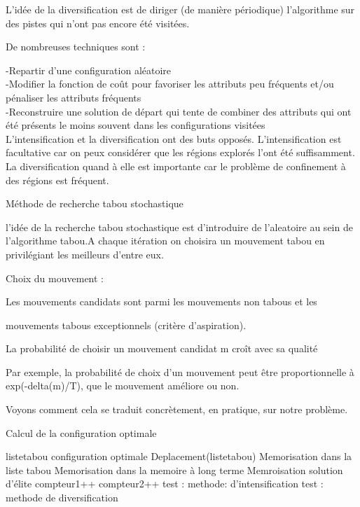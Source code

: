 \documentclass{report}
\begin{document}
L’idée de la diversification est de diriger (de manière périodique) l’algorithme sur des pistes qui n’ont pas encore été visitées.

De nombreuses techniques sont :

-Repartir d’une configuration aléatoire\\
-Modifier la fonction de coût pour favoriser les attributs peu fréquents et/ou pénaliser les attributs fréquents\\
-Reconstruire une solution de départ qui tente de combiner des attributs qui ont été présents le moins souvent dans les configurations visitées\\

L’intensification et la diversification ont des buts opposés. L’intensification est facultative
car on peux considérer que les régions explorés l’ont été suffisamment. La diversification quand à elle est importante car le problème de confinement à des régions est fréquent.


Méthode de recherche tabou stochastique

l’idée de la recherche tabou stochastique est d’introduire de l’aleatoire au sein de l’algorithme tabou.A chaque itération on choisira un mouvement tabou en privilégiant les meilleurs d’entre eux.

Choix du mouvement :

Les mouvements candidats sont parmi les mouvements non tabous et les

mouvements tabous exceptionnels (critère d’aspiration).

La probabilité de choisir un mouvement candidat m croît avec sa qualité

Par exemple, la probabilité de choix d’un mouvement peut être proportionnelle
à exp(-delta(m)/T), que le mouvement améliore ou non.

Voyons comment cela se traduit concrètement, en pratique, sur notre problème.

\begin{algorithm}
\caption{Calcul de la configuration optimale}
\begin{algorithmic}
\REQUIRE listetabou
\ENSURE configuration optimale
\STATE Deplacement(listetabou)
\STATE Memorisation dans la liste tabou
\STATE Memorisation dans la memoire à long terme
\STATE Memroisation solution d'élite
\STATE compteur1++
\STATE compteur2++
\STATE test : methode: d'intensification
\STATE test : methode de diversification
\ENDWHILE
\end{algorithmic}
\end{algorithm}
\end{document}
